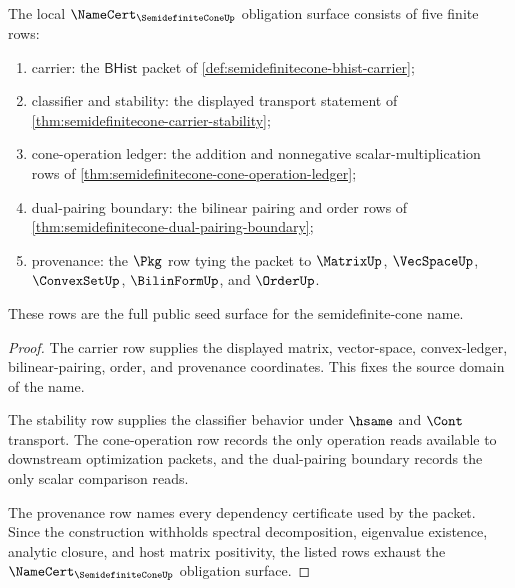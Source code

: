 \begin{theorem}
\label{thm:semidefinitecone-namecert-obligation-surface}
The local $\NameCert_{\SemidefiniteConeUp}$ obligation surface consists of five finite rows:
\begin{enumerate}
\item carrier: the $\mathsf{BHist}$ packet of \autoref{def:semidefinitecone-bhist-carrier};
\item classifier and stability: the displayed transport statement of \autoref{thm:semidefinitecone-carrier-stability};
\item cone-operation ledger: the addition and nonnegative scalar-multiplication rows of \autoref{thm:semidefinitecone-cone-operation-ledger};
\item dual-pairing boundary: the bilinear pairing and order rows of \autoref{thm:semidefinitecone-dual-pairing-boundary};
\item provenance: the $\Pkg$ row tying the packet to $\MatrixUp$, $\VecSpaceUp$, $\ConvexSetUp$, $\BilinFormUp$, and $\OrderUp$.
\end{enumerate}
These rows are the full public seed surface for the semidefinite-cone name.
\end{theorem}
\begin{proof}
The carrier row supplies the displayed matrix, vector-space, convex-ledger, bilinear-pairing, order, and provenance coordinates. This fixes the source domain of the name.

The stability row supplies the classifier behavior under $\hsame$ and $\Cont$ transport. The cone-operation row records the only operation reads available to downstream optimization packets, and the dual-pairing boundary records the only scalar comparison reads.

The provenance row names every dependency certificate used by the packet. Since the construction withholds spectral decomposition, eigenvalue existence, analytic closure, and host matrix positivity, the listed rows exhaust the $\NameCert_{\SemidefiniteConeUp}$ obligation surface.
\end{proof}

